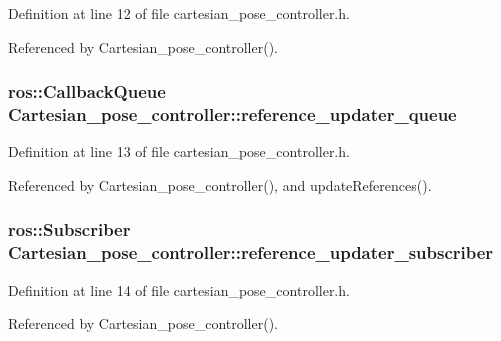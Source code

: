 Definition at line 12 of file cartesian\-\_\-pose\-\_\-controller.\-h.



Referenced by Cartesian\-\_\-pose\-\_\-controller().

\hypertarget{classCartesian__pose__controller_a6eea82d82ccd6c925be31c18e1b4a432}{
\subsubsection[{reference\-\_\-updater\-\_\-queue}]{\setlength{\rightskip}{0pt plus 5cm}ros\-::\-Callback\-Queue Cartesian\-\_\-pose\-\_\-controller\-::reference\-\_\-updater\-\_\-queue\hspace{0.3cm}{\ttfamily [private]}}}\label{classCartesian__pose__controller_a6eea82d82ccd6c925be31c18e1b4a432}


Definition at line 13 of file cartesian\-\_\-pose\-\_\-controller.\-h.



Referenced by Cartesian\-\_\-pose\-\_\-controller(), and update\-References().

\hypertarget{classCartesian__pose__controller_a9394ae99649279f815c234b1ca7801b6}{
\subsubsection[{reference\-\_\-updater\-\_\-subscriber}]{\setlength{\rightskip}{0pt plus 5cm}ros\-::\-Subscriber Cartesian\-\_\-pose\-\_\-controller\-::reference\-\_\-updater\-\_\-subscriber\hspace{0.3cm}{\ttfamily [private]}}}\label{classCartesian__pose__controller_a9394ae99649279f815c234b1ca7801b6}


Definition at line 14 of file cartesian\-\_\-pose\-\_\-controller.\-h.



Referenced by Cartesian\-\_\-pose\-\_\-controller().


